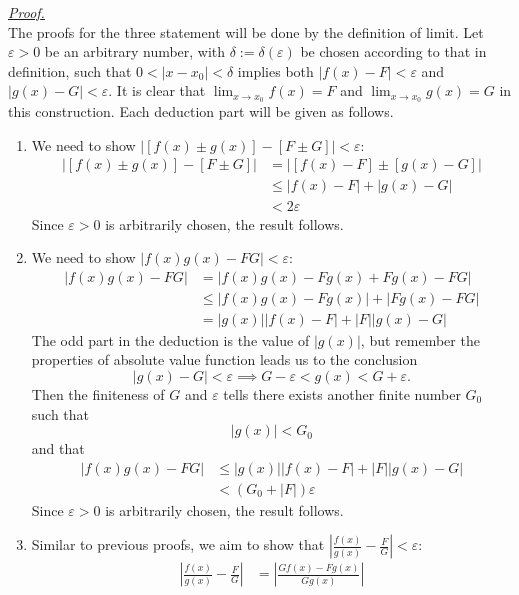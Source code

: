 \documentclass[12pt]{article}
\renewenvironment{proof}[1][Proof]{\begin{snugshade*} \underline{\textit{{#1}.}}\\}{\hfill \qedsymbol \end{snugshade*}}
\begin{document}
    \begin{proof}
        The proofs for the three statement will be done by the definition of limit. Let $\varepsilon>0$ be an arbitrary number, with $\delta:=\delta(\varepsilon)$ be chosen according to that in definition, such that $0<|x-x_0|<\delta$ implies both $|f(x)-F|<\varepsilon$ and $|g(x)-G|<\varepsilon$. It is clear that $\displaystyle\lim_{x\to x_0}f(x)=F$ and $\displaystyle\lim_{x\to x_0}g(x)=G$ in this construction. Each deduction part will be given as follows.
        \begin{enumerate}
            \item We need to show $\big|[f(x)\pm g(x)]-[F\pm G]\big|<\varepsilon$:\begin{align*}
                \big|[f(x)\pm g(x)]-[F\pm G]\big|&=\big|[f(x)-F]\pm[g(x)-G]\big|\\
                &\leq |f(x)-F|+|g(x)-G|\\
                &<2\varepsilon
            \end{align*}
            Since $\varepsilon>0$ is arbitrarily chosen, the result follows.
            \item We need to show $|f(x)g(x)-FG|<\varepsilon$:\begin{align*}
                |f(x)g(x)-FG|&=|f(x)g(x)-Fg(x)+Fg(x)-FG|\\
                &\leq |f(x)g(x)-Fg(x)|+|Fg(x)-FG|\\
                &=|g(x)||f(x)-F|+|F||g(x)-G|
            \end{align*}
            The odd part in the deduction is the value of $|g(x)|$, but remember the properties of absolute value function leads us to the conclusion \[|g(x)-G|<\varepsilon \implies G-\varepsilon<g(x)<G+\varepsilon.\]
            Then the finiteness of $G$ and $\varepsilon$ tells there exists another finite number $G_0$ such that \[|g(x)|<G_0\] and that \begin{align*}
                |f(x)g(x)-FG|&\leq |g(x)||f(x)-F|+|F||g(x)-G|\\
                &<(G_0+|F|)\varepsilon
            \end{align*}
            Since $\varepsilon>0$ is arbitrarily chosen, the result follows.
            \item Similar to previous proofs, we aim to show that $|\frac{f(x)}{g(x)}-\frac{F}{G}|<\varepsilon$:\begin{align*}
                |\frac{f(x)}{g(x)}-\frac{F}{G}|&=|\frac{Gf(x)-Fg(x)}{Gg(x)}|\\

\end{align*}
\end{enumerate}
\end{proof}
\end{document}
